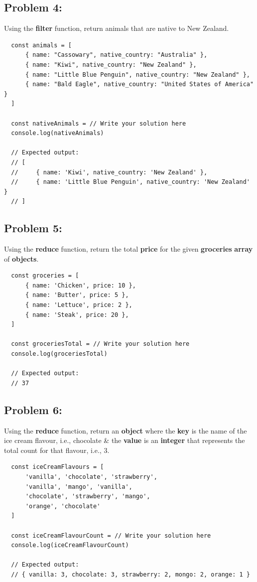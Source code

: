 \documentclass{article}
\begin{document}
\subsection*{Problem 4:}
Using the \textbf{filter} function, return animals that are native to New Zealand.

\begin{verbatim}
  const animals = [
      { name: "Cassowary", native_country: "Australia" },
      { name: "Kiwi", native_country: "New Zealand" },
      { name: "Little Blue Penguin", native_country: "New Zealand" },
      { name: "Bald Eagle", native_country: "United States of America" }
  ]

  const nativeAnimals = // Write your solution here
  console.log(nativeAnimals)

  // Expected output:
  // [
  //     { name: 'Kiwi', native_country: 'New Zealand' },
  //     { name: 'Little Blue Penguin', native_country: 'New Zealand' }
  // ]
\end{verbatim}

\subsection*{Problem 5:}
Using the \textbf{reduce} function, return the total \textbf{price} for the given \textbf{groceries} \textbf{array} of \textbf{objects}.

\begin{verbatim}
  const groceries = [
      { name: 'Chicken', price: 10 },
      { name: 'Butter', price: 5 },
      { name: 'Lettuce', price: 2 },
      { name: 'Steak', price: 20 },
  ]

  const groceriesTotal = // Write your solution here
  console.log(groceriesTotal)

  // Expected output:
  // 37
\end{verbatim}

\subsection*{Problem 6:}
Using the \textbf{reduce} function, return an \textbf{object} where the \textbf{key} is the name of the ice cream flavour, i.e., chocolate \& the \textbf{value} is an \textbf{integer} that represents the total count for that flavour, i.e., 3.

\begin{verbatim}
  const iceCreamFlavours = [
      'vanilla', 'chocolate', 'strawberry', 
      'vanilla', 'mango', 'vanilla', 
      'chocolate', 'strawberry', 'mango', 
      'orange', 'chocolate'
  ]

  const iceCreamFlavourCount = // Write your solution here
  console.log(iceCreamFlavourCount)

  // Expected output:
  // { vanilla: 3, chocolate: 3, strawberry: 2, mongo: 2, orange: 1 }
\end{verbatim}
\end{document}
